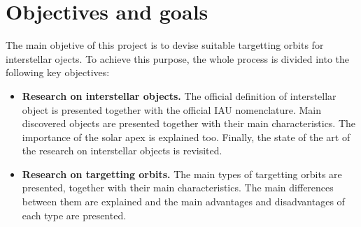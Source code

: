 \section{Objectives and goals}

The main objetive of this project is to devise suitable targetting orbits for
interstellar ojects. To achieve this purpose, the whole process is divided
into the following key objectives:

\begin{itemize}
    \item \textbf{Research on interstellar objects.}
        The official definition of interstellar object is presented together
        with the official IAU nomenclature. Main discovered objects are
        presented together with their main characteristics. The importance of
        the solar apex is explained too. Finally, the state of the art of the
        research on interstellar objects is revisited.
    \item \textbf{Research on targetting orbits.}
        The main types of targetting orbits are presented, together with their
        main characteristics. The main differences between them are explained
        and the main advantages and disadvantages of each type are presented.
\end{itemize}
